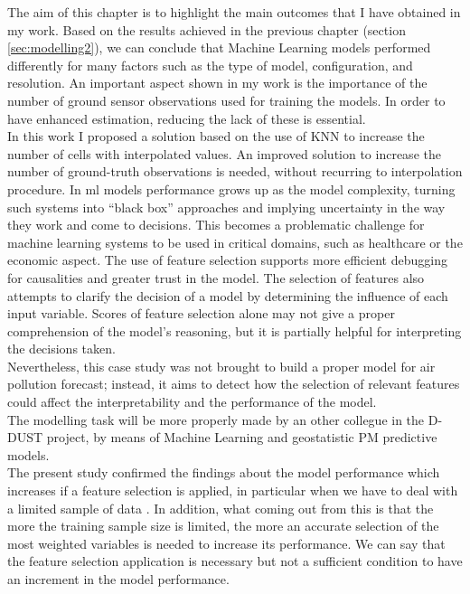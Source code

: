 The aim of this chapter is to highlight the main outcomes that I have obtained in my work.
Based on the results achieved in the previous chapter (section \ref{sec:modelling2}), we can conclude that Machine Learning models performed differently for many factors such as the type of model, configuration, and resolution.
An important aspect shown in my work is the importance of the number of ground sensor observations used for training the models. In order to have enhanced estimation, reducing the lack of these is essential.\\
In this work I proposed a solution based on the use of KNN to increase the number of cells with interpolated values. An improved solution to increase the number of ground-truth observations is needed, without recurring to interpolation procedure.
In \acrshort{ml} models performance grows up as the model complexity, turning such systems into “black box” approaches and implying uncertainty in the way they work and come to decisions. 
This becomes a problematic challenge for machine learning systems to be used in critical domains, such as healthcare or the economic aspect.
The use of feature selection supports more efficient debugging for causalities and greater trust in the model.
The selection of features also attempts to clarify the decision of a model by determining the influence of each input variable. 
Scores of feature selection alone may not give a proper comprehension of the model’s reasoning, but it is partially helpful for interpreting the decisions taken.\\
Nevertheless, this case study was not brought to build a proper model for air pollution forecast; instead, it aims to detect how the selection of relevant features could affect the interpretability and the performance of the model. \\
The modelling task will be more properly made by an other collegue in the D-DUST project, by means of Machine Learning and geostatistic PM predictive models.\\
The present study confirmed the findings about the model performance which increases if a feature selection is applied, in particular when we have to deal with a limited sample of data \cite{vabalas2019machine}. 
In addition, what coming out from this is that the more the training sample size is limited, the more an accurate selection of the most weighted variables is needed to increase its performance.
We can say that the feature selection application is necessary but not a sufficient condition to have an increment in the model performance.

